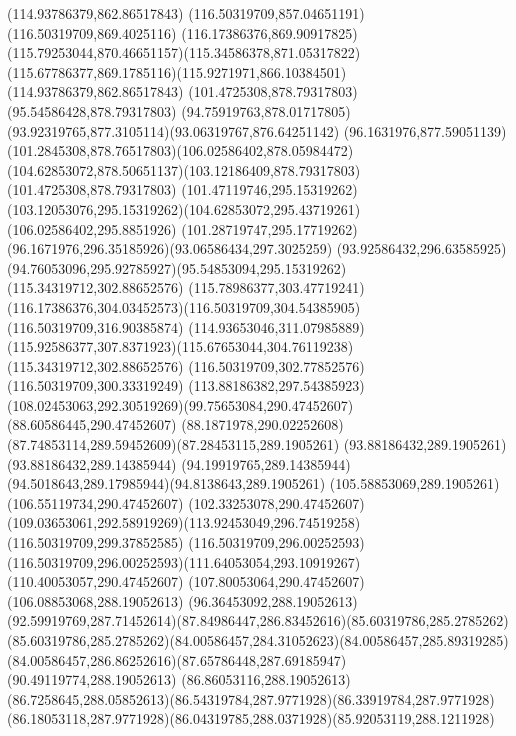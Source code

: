 {{		\moveto(114.93786379,862.86517843)
		\lineto(116.50319709,857.04651191)
		\lineto(116.50319709,869.4025116)
		\curveto(116.17386376,869.90917825)(115.79253044,870.46651157)(115.34586378,871.05317822)
		\curveto(115.67786377,869.1785116)(115.9271971,866.10384501)(114.93786379,862.86517843)
		\moveto(101.4725308,878.79317803)
		\lineto(95.54586428,878.79317803)
		\curveto(94.75919763,878.01717805)(93.92319765,877.3105114)(93.06319767,876.64251142)
		\curveto(96.1631976,877.59051139)(101.2845308,878.76517803)(106.02586402,878.05984472)
		\curveto(104.62853072,878.50651137)(103.12186409,878.79317803)(101.4725308,878.79317803)
		\moveto(101.47119746,295.15319262)
		\curveto(103.12053076,295.15319262)(104.62853072,295.43719261)(106.02586402,295.8851926)
		\curveto(101.28719747,295.17719262)(96.1671976,296.35185926)(93.06586434,297.3025259)
		\curveto(93.92586432,296.63585925)(94.76053096,295.92785927)(95.54853094,295.15319262)
		\closepath
		\moveto(115.34319712,302.88652576)
		\curveto(115.78986377,303.47719241)(116.17386376,304.03452573)(116.50319709,304.54385905)
		\lineto(116.50319709,316.90385874)
		\lineto(114.93653046,311.07985889)
		\curveto(115.92586377,307.8371923)(115.67653044,304.76119238)(115.34319712,302.88652576)
		\moveto(116.50319709,302.77852576)
		\lineto(116.50319709,300.33319249)
		\curveto(113.88186382,297.54385923)(108.02453063,292.30519269)(99.75653084,290.47452607)
		\lineto(88.60586445,290.47452607)
		\curveto(88.1871978,290.02252608)(87.74853114,289.59452609)(87.28453115,289.1905261)
		\lineto(93.88186432,289.1905261)
		\lineto(93.88186432,289.14385944)
		\curveto(94.19919765,289.14385944)(94.5018643,289.17985944)(94.8138643,289.1905261)
		\lineto(105.58853069,289.1905261)
		\lineto(106.55119734,290.47452607)
		\lineto(102.33253078,290.47452607)
		\curveto(109.03653061,292.58919269)(113.92453049,296.74519258)(116.50319709,299.37852585)
		\lineto(116.50319709,296.00252593)
		\curveto(116.50319709,296.00252593)(111.64053054,293.10919267)(110.40053057,290.47452607)
		\lineto(107.80053064,290.47452607)
		\lineto(106.08853068,288.19052613)
		\lineto(96.36453092,288.19052613)
		\curveto(92.59919769,287.71452614)(87.84986447,286.83452616)(85.60319786,285.2785262)
		\curveto(85.60319786,285.2785262)(84.00586457,284.31052623)(84.00586457,285.89319285)
		\curveto(84.00586457,286.86252616)(87.65786448,287.69185947)(90.49119774,288.19052613)
		\lineto(86.86053116,288.19052613)
		\curveto(86.7258645,288.05852613)(86.54319784,287.9771928)(86.33919784,287.9771928)
		\curveto(86.18053118,287.9771928)(86.04319785,288.0371928)(85.92053119,288.1211928)
}}
